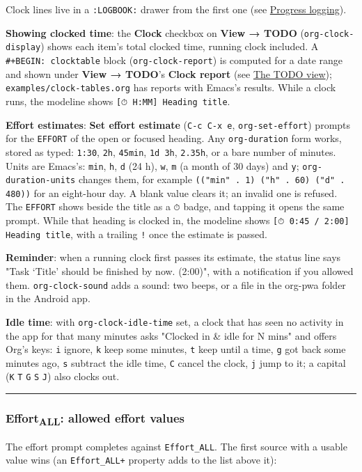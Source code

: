 \documentclass[11pt]{article}
\begin{document}
Clock lines live in a \texttt{:LOGBOOK:} drawer from the first one (see \hyperref[sec:orgfbb8a58]{Progress logging}).

\textbf{Showing clocked time}: the \textbf{Clock} checkbox on \textbf{View → TODO} (\texttt{org-clock-display}) shows each item's total clocked time, running clock included. A \texttt{\#+BEGIN: clocktable} block (\texttt{org-clock-report}) is computed for a date range and shown under \textbf{View → TODO}'s \textbf{Clock report} (see \hyperref[sec:org0699f8b]{The TODO view}); \texttt{examples/clock-tables.org} has reports with Emacs's results. While a clock runs, the modeline shows \texttt{[⏱ H:MM] Heading title}.

\textbf{Effort estimates}: \textbf{Set effort estimate} (\texttt{C-c C-x e}, \texttt{org-set-effort}) prompts for the \texttt{EFFORT} of the open or focused heading. Any \texttt{org-duration} form works, stored as typed: \texttt{1:30}, \texttt{2h}, \texttt{45min}, \texttt{1d 3h}, \texttt{2.35h}, or a bare number of minutes. Units are Emacs's: \texttt{min}, \texttt{h}, \texttt{d} (24 h), \texttt{w}, \texttt{m} (a month of 30 days) and \texttt{y}; \texttt{org-duration-units} changes them, for example \texttt{(("min" . 1) ("h" . 60) ("d" . 480))} for an eight-hour day. A blank value clears it; an invalid one is refused. The \texttt{EFFORT} shows beside the title as a \texttt{⏱} badge, and tapping it opens the same prompt. While that heading is clocked in, the modeline shows \texttt{[⏱ 0:45 / 2:00] Heading title}, with a trailing \texttt{!} once the estimate is passed.

\textbf{Reminder}: when a running clock first passes its estimate, the status line says "Task ‘Title’ should be finished by now. (2:00)", with a notification if you allowed them. \texttt{org-clock-sound} adds a sound: two beeps, or a file in the org-pwa folder in the Android app.

\textbf{Idle time}: with \texttt{org-clock-idle-time} set, a clock that has seen no activity in the app for that many minutes asks "Clocked in \& idle for N mins" and offers Org's keys: \texttt{i} ignore, \texttt{k} keep some minutes, \texttt{t} keep until a time, \texttt{g} got back some minutes ago, \texttt{s} subtract the idle time, \texttt{C} cancel the clock, \texttt{j} jump to it; a capital (\texttt{K} \texttt{T} \texttt{G} \texttt{S} \texttt{J}) also clocks out.

\noindent\rule{\textwidth}{0.5pt}

\subsubsection{Effort\textsubscript{ALL}: allowed effort values}
\label{sec:orgb982436}
The effort prompt completes against \texttt{Effort\_ALL}. The first source with a usable value wins (an \texttt{Effort\_ALL+} property adds to the list above it):
\end{document}
